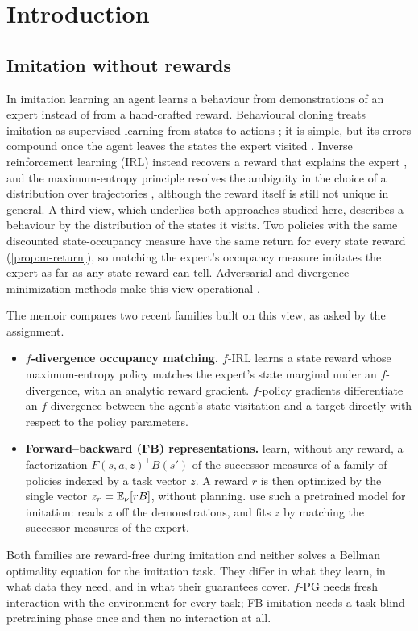 \section{Introduction}\label{sec:intro}

\subsection{Imitation without rewards}

In imitation learning an agent learns a behaviour from demonstrations of an expert instead of from a hand-crafted reward.
Behavioural cloning treats imitation as supervised learning from states to actions \citep{pomerleau1989alvinn}; it is simple, but its errors compound once the agent leaves the states the expert visited \citep{ross2011dagger}.
Inverse reinforcement learning (IRL) instead recovers a reward that explains the expert \citep{ng2000algorithms,abbeel2004apprenticeship}, and the maximum-entropy principle resolves the ambiguity in the choice of a distribution over trajectories \citep{ziebart2008maximum}, although the reward itself is still not unique in general.
A third view, which underlies both approaches studied here, describes a behaviour by the distribution of the states it visits.
Two policies with the same discounted state-occupancy measure have the same return for every state reward (\cref{prop:m-return}), so matching the expert's occupancy measure imitates the expert as far as any state reward can tell.
Adversarial and divergence-minimization methods make this view operational \citep{ho2016gail,fu2018airl,ghasemipour2020divergence}.

The memoir compares two recent families built on this view, as asked by the assignment.
\begin{itemize}[nosep]
\item \textbf{$f$-divergence occupancy matching.} $f$-IRL \citep{ni2021firl} learns a state reward whose maximum-entropy policy matches the expert's state marginal under an $f$-divergence, with an analytic reward gradient. $f$-policy gradients \citep{agarwal2023fpg} differentiate an $f$-divergence between the agent's state visitation and a target directly with respect to the policy parameters.
\item \textbf{Forward--backward (FB) representations.} \citet{touati2021fb} learn, without any reward, a factorization $F(s,a,z)^\top B(s')$ of the successor measures of a family of policies indexed by a task vector $z$. A reward $r$ is then optimized by the single vector $z_r=\mathbb{E}_\nu[rB]$, without planning. \citet{pirotta2024fast} use such a pretrained model for imitation: \ERFB{} reads $z$ off the demonstrations, and \DMFB{} fits $z$ by matching the successor measures of the expert.
\end{itemize}
Both families are reward-free during imitation and neither solves a Bellman optimality equation for the imitation task.
They differ in what they learn, in what data they need, and in what their guarantees cover.
$f$-PG needs fresh interaction with the environment for every task; FB imitation needs a task-blind pretraining phase once and then no interaction at all.

